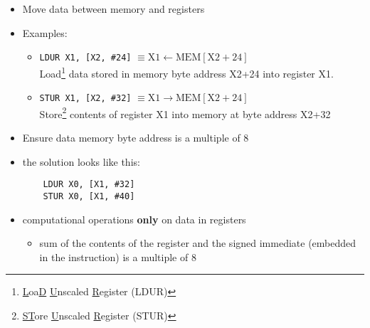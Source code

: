 \begin{frame}[fragile]
  \begin{itemize}
     \item Move data between memory and registers

     \item Examples:
     \begin{itemize}
         \item \texttt {LDUR X1, [X2, \#24]} $\equiv \text{X1} \leftarrow \text{MEM}[\text{X2} + 24] $ \\
         Load\footnote{\underline{L}oa\underline{D} \underline{U}nscaled \underline{R}egister (LDUR)} data stored in memory byte address X2+24 into register X1.
     
     \item  \texttt{STUR X1, [X2, \#32]} $\equiv \text{X1} \rightarrow \text{MEM}[\text{X2} + 24] $\\
      Store\footnote{\underline{ST}ore \underline{U}nscaled \underline{R}egister (STUR)} contents of register X1 into memory at byte address X2+32
     \end{itemize}
     \item Ensure data memory byte address is a multiple of 8
 \end{itemize}

\BNotes\ifnum{}
\begin{itemize}
\item the solution looks like this:
\begin{verbatim}
    LDUR X0, [X1, #32]
    STUR X0, [X1, #40]
\end{verbatim}
     \item computational operations \textbf{only} on data in registers  
\begin{itemize}
         \item sum of the contents of the register and the signed immediate (embedded in the instruction) is a multiple of 8
     \end{itemize}
    
\end{itemize}
\fi
\end{frame}

